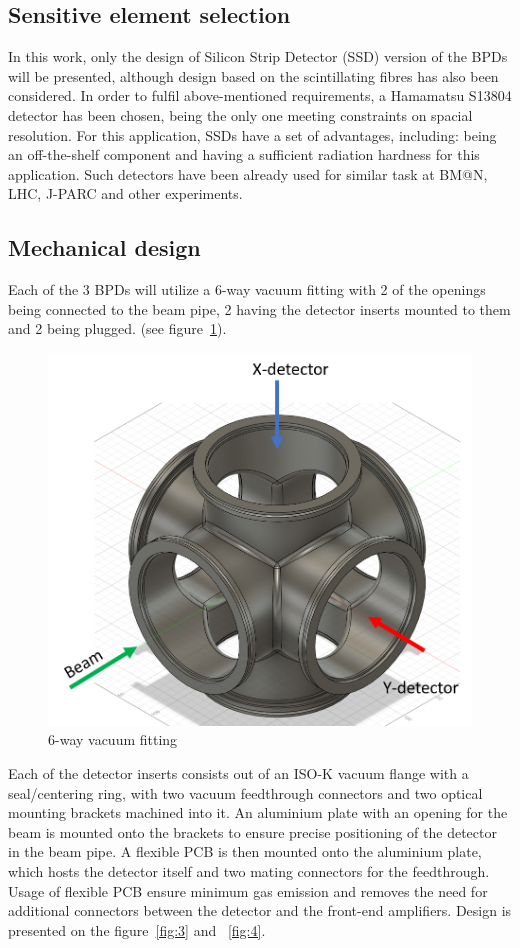 \documentclass[a4paper]{jpconf}
\begin{document}
\subsection{Sensitive element selection}
In this work, only the design of Silicon Strip Detector (SSD) version of the BPDs will be presented, although design based on the scintillating fibres has also been considered.
In order to fulfil above-mentioned requirements, a Hamamatsu S13804 detector has been chosen, being the only one meeting constraints on spacial resolution.
For this application, SSDs have a set of advantages, including: being an off-the-shelf component and having a sufficient radiation hardness for this application. Such detectors have been already used for similar task at BM@N, LHC, J-PARC and other experiments.

\subsection{Mechanical design}
Each of the 3 BPDs will utilize a 6-way vacuum fitting with 2 of the openings being connected to the beam pipe, 2 having the detector inserts mounted to them and 2 being plugged. (see figure~\ref{fig:2}).

\begin{figure}[htbp]
	\centering
	\includegraphics[width=.4\textwidth]{6_way_fitting.png}
	\caption{\label{fig:2} 6-way vacuum fitting}
\end{figure}

Each of the detector inserts consists out of an ISO-K vacuum flange with a seal/centering ring, with two vacuum feedthrough connectors and two optical mounting brackets machined into it. An aluminium plate with an opening for the beam is mounted onto the brackets to ensure precise positioning of the detector in the beam pipe. A flexible PCB is then mounted onto the aluminium plate, which hosts the detector itself and two mating connectors for the feedthrough. Usage of flexible PCB ensure minimum gas emission and removes the need for additional connectors between the detector and the front-end amplifiers. Design is presented on the figure~\ref{fig:3} and ~\ref{fig:4}.
\end{document}
